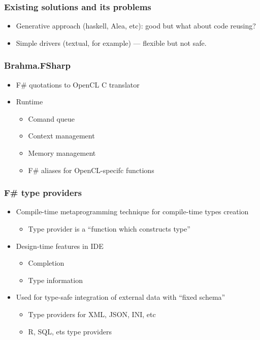 \documentclass[xcolor=table]{beamer}
\begin{document}
\begin{frame}[fragile]
  \transwipe[direction=90]
  \frametitle{Existing solutions and its problems}
  \begin{itemize}
  \item Generative approach (haskell, Alea, etc): good but what about code reusing?
  \item Simple drivers (textual, for example) --- flexible but not safe.
  \end{itemize}
\end{frame}

\begin{frame}[fragile]
  \transwipe[direction=90]
  \frametitle{Brahma.FSharp}
  \begin{itemize}
  \item F\# quotations to OpenCL C translator
  \item Runtime
      \begin{itemize}
        \item Comand queue
        \item Context management
        \item Memory management
        \item F\# aliases for OpenCL-specifc functions
      \end{itemize}

  \end{itemize}
\end{frame}

\begin{frame}
  \transwipe[direction=90]
  \frametitle{F\# type providers}
\begin{itemize}
 \item Compile-time metaprogramming technique for compile-time types creation
 \begin{itemize}
  \item Type provider is a ``function which constructs type''
 \end{itemize}
 \item Design-time features in IDE
 \begin{itemize}
   \item Completion
   \item Type information
 \end{itemize}
 \item Used for type-safe integration of external data with ``fixed schema''
 \begin{itemize}
   \item Type providers for XML, JSON, INI, etc
   \item R, SQL, ets type providers
 \end{itemize}
\end{itemize}

\end{frame}
\end{document}
